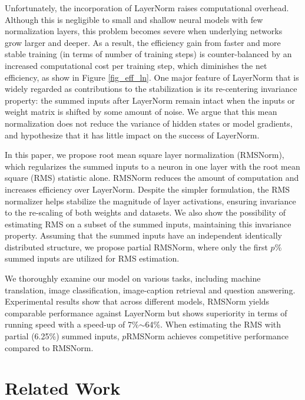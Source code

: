 Unfortunately, the incorporation of LayerNorm raises computational overhead. Although this is negligible to small and shallow neural models with few normalization layers, this problem becomes severe when underlying networks grow larger and deeper. As a result, the efficiency gain from faster and more stable training (in terms of number of training steps) is counter-balanced by an increased computational cost per training step, which diminishes the net efficiency, as show in Figure \ref{fig_eff_ln}. One major feature of LayerNorm that is widely regarded as contributions to the stabilization is its re-centering invariance property: the summed inputs after LayerNorm remain intact when the inputs or weight matrix is shifted by some amount of noise. We argue that this mean normalization does not reduce the variance of hidden states or model gradients, and hypothesize that it has little impact on the success of LayerNorm.

In this paper, we propose root mean square layer normalization (RMSNorm), which regularizes the summed inputs to a neuron in one layer with the root mean square (RMS) statistic alone. RMSNorm reduces the amount of computation and increases efficiency over LayerNorm. Despite the simpler formulation, the RMS normalizer helps stabilize the magnitude of layer activations, ensuring invariance to the re-scaling of both weights and datasets. We also show the possibility of estimating RMS on a subset of the summed inputs, maintaining this invariance property. Assuming that the summed inputs have an independent identically distributed structure, we propose partial RMSNorm, where only the first $p$\% summed inputs are utilized for RMS estimation.

We thoroughly examine our model on various tasks, including machine translation, image classification, image-caption retrieval and question answering. Experimental results show that across different models, RMSNorm yields comparable performance against LayerNorm but shows superiority in terms of running speed with a speed-up of 7\%$\sim$64\%. When estimating the RMS with partial (6.25\%) summed inputs, $p$RMSNorm achieves competitive performance compared to RMSNorm.

\section{Related Work}


